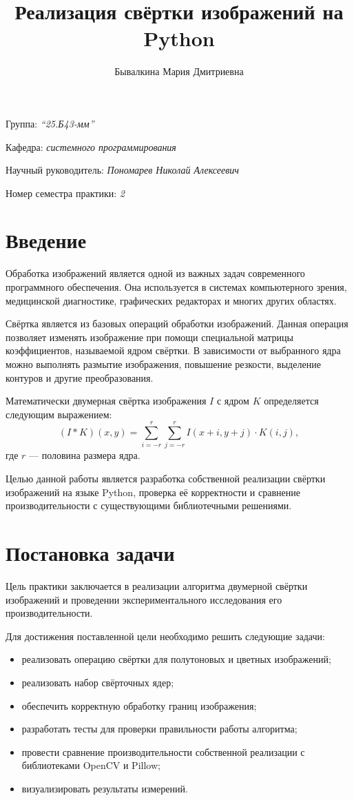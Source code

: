 \documentclass[a4paper]{article}
\title{Реализация свёртки изображений на Python}
\author{Бывалкина Мария Дмитриевна}
\date{}
\begin{document}
\maketitle

\begin{flushright}
    Группа: \emph{\enquote{25.Б43-мм}}

    Кафедра: \emph{системного программирования}

    Научный руководитель: \emph{Пономарев Николай Алексеевич}

    Номер семестра практики: \emph{2}
\end{flushright}

\section{Введение}

Обработка изображений является одной из важных задач современного программного обеспечения. Она используется в системах компьютерного зрения, медицинской диагностике, графических редакторах и многих других областях.

Свёртка является из базовых операций обработки изображений. Данная операция позволяет изменять изображение при помощи специальной матрицы коэффициентов, называемой ядром свёртки. В зависимости от выбранного ядра можно выполнять размытие изображения, повышение резкости, выделение контуров и другие преобразования.

Математически двумерная свёртка изображения $I$ с ядром $K$ определяется следующим выражением:
\[
(I * K)(x,y)=
\sum_{i=-r}^{r}
\sum_{j=-r}^{r}
I(x+i,y+j)\cdot K(i,j),
\]
где $r$ --- половина размера ядра.

Целью данной работы является разработка собственной реализации свёртки изображений на языке Python, проверка её корректности и сравнение производительности с существующими библиотечными решениями.

\section{Постановка задачи}

Цель практики заключается в реализации алгоритма двумерной свёртки изображений и проведении экспериментального исследования его производительности.

Для достижения поставленной цели необходимо решить следующие задачи:
\begin{itemize}
    \item реализовать операцию свёртки для полутоновых и цветных изображений;
    \item реализовать набор свёрточных ядер;
    \item обеспечить корректную обработку границ изображения;
    \item разработать тесты для проверки правильности работы алгоритма;
    \item провести сравнение производительности собственной реализации с библиотеками OpenCV и Pillow;
    \item визуализировать результаты измерений.
\end{itemize}
\end{document}
